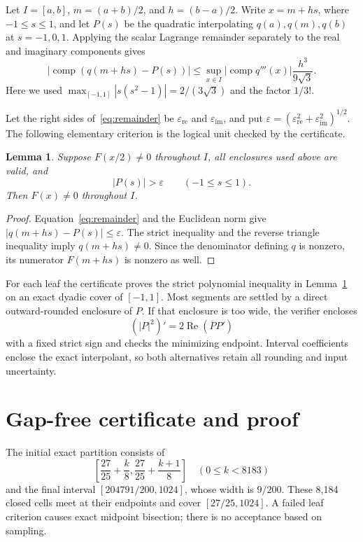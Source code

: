 \documentclass[11pt]{article}
\newtheorem{lemma}[theorem]{Lemma}
\begin{document}
Let $I=[a,b]$, $m=(a+b)/2$, and $h=(b-a)/2$.  Write
$x=m+hs$, where $-1\leq s\leq1$, and let $P(s)$ be the quadratic
interpolating $q(a),q(m),q(b)$ at $s=-1,0,1$.  Applying the scalar Lagrange
remainder separately to the real and imaginary components gives
\begin{equation}\label{eq:remainder}
 |\operatorname{comp}(q(m+hs)-P(s))|
 \leq \sup_{x\in I}|\operatorname{comp}q'''(x)|
       \frac{h^3}{9\sqrt3}.
\end{equation}
Here we used
$\max_{[-1,1]}|s(s^2-1)|=2/(3\sqrt3)$ and the factor $1/3!$.

Let the right sides of~\eqref{eq:remainder} be
$\varepsilon_{\mathrm{re}}$ and $\varepsilon_{\mathrm{im}}$, and put
$\varepsilon=(\varepsilon_{\mathrm{re}}^2+
\varepsilon_{\mathrm{im}}^2)^{1/2}$.  The following elementary criterion is
the logical unit checked by the certificate.

\begin{lemma}\label{lem:leaf}
Suppose $F(x/2)\ne0$ throughout $I$, all enclosures used above are valid,
and
\[
                  |P(s)|>\varepsilon\qquad(-1\leq s\leq1).
\]
Then $F(x)\ne0$ throughout $I$.
\end{lemma}

\begin{proof}
Equation~\eqref{eq:remainder} and the Euclidean norm give
$|q(m+hs)-P(s)|\leq\varepsilon$.  The strict inequality and the reverse
triangle inequality imply $q(m+hs)\ne0$.  Since the denominator defining
$q$ is nonzero, its numerator $F(m+hs)$ is nonzero as well.
\end{proof}

For each leaf the certificate proves the strict polynomial inequality in
Lemma~\ref{lem:leaf} on an exact dyadic cover of $[-1,1]$.  Most segments are
settled by a direct outward-rounded enclosure of $P$.  If that enclosure is
too wide, the verifier encloses
\[
              (|P|^2)'=2\operatorname{Re}(\overline P P')
\]
with a fixed strict sign and checks the minimizing endpoint.  Interval
coefficients enclose the exact interpolant, so both alternatives retain all
rounding and input uncertainty.

\section{Gap-free certificate and proof}

The initial exact partition consists of
\[
 \left[\frac{27}{25}+\frac{k}{8},
       \frac{27}{25}+\frac{k+1}{8}\right]
       \quad(0\leq k<8183)
\]
and the final interval $[204791/200,1024]$, whose width is $9/200$.
These 8,184 closed cells meet at their endpoints and cover
$[27/25,1024]$.  A failed leaf criterion causes exact midpoint bisection;
there is no acceptance based on sampling.
\end{document}
